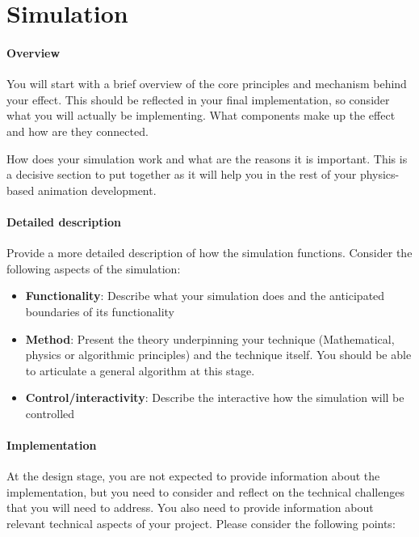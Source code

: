 \documentclass[conference,backref=page]{acmsiggraph}
\begin{document}
\onecolumn
\twocolumn
\section{Simulation}

\paragraph{Overview}
You will start with a brief overview of the core principles and mechanism behind your effect.  This should be reflected in your final implementation, so consider what you will actually be implementing. What components make up the effect and how are they connected.

How does your simulation work and what are the reasons it is important.  This is a decisive section to put together as it will help you in the rest of your physics-based animation development.

\paragraph{Detailed description}
Provide a more detailed description of how the simulation functions. Consider the following aspects of the simulation:
\begin{itemize}
\item {\bf Functionality}: Describe what your simulation does and the anticipated boundaries of its functionality
\item {\bf Method}: Present the theory underpinning your technique (Mathematical, physics or algorithmic principles) and the technique itself. You should be able to articulate a general algorithm at this stage.
\item {\bf Control/interactivity}: Describe the interactive how the simulation will be controlled
\end{itemize}

\paragraph{Implementation}
At the design stage, you are not expected to provide information about the implementation, but you need to consider and reflect on the technical challenges that you will need to address. You also need to provide information about relevant technical aspects of your project. Please consider the following points:
\end{document}

